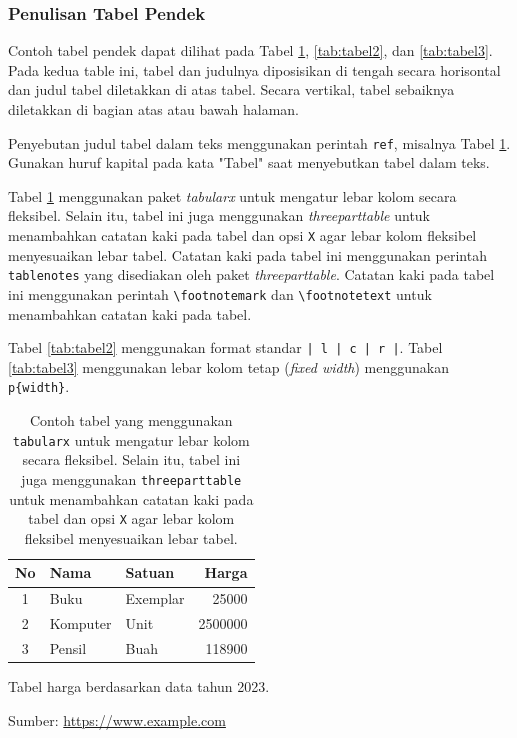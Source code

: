 \subsubsection{Penulisan Tabel Pendek}
Contoh tabel pendek dapat dilihat pada Tabel \ref{tab:tabel1}, \ref{tab:tabel2}, dan \ref{tab:tabel3}.
Pada kedua table ini, tabel dan judulnya diposisikan di tengah secara horisontal dan
judul tabel diletakkan di atas tabel. Secara vertikal, tabel sebaiknya diletakkan di bagian atas atau bawah halaman.

Penyebutan judul tabel dalam teks menggunakan perintah \texttt{ref}, misalnya Tabel \ref{tab:tabel1}.
Gunakan huruf kapital pada kata "Tabel" saat menyebutkan tabel dalam teks.

Tabel \ref{tab:tabel1} menggunakan paket \textit{tabularx} untuk mengatur lebar kolom secara fleksibel.
Selain itu, tabel ini juga menggunakan \textit{threeparttable} untuk menambahkan catatan kaki pada tabel
dan opsi \texttt{X} agar lebar kolom fleksibel menyesuaikan lebar tabel.
Catatan kaki pada tabel ini menggunakan perintah \texttt{tablenotes} yang disediakan oleh paket \textit{threeparttable}.
Catatan kaki pada tabel ini menggunakan perintah \texttt{\textbackslash footnotemark} dan \texttt{\textbackslash footnotetext} untuk menambahkan catatan kaki pada tabel.

Tabel \ref{tab:tabel2} menggunakan format standar \texttt{| l | c | r |}.
Tabel \ref{tab:tabel3} menggunakan lebar kolom tetap (\textit{fixed width}) menggunakan \texttt{p\{width\}}.

\begin{table}
  \centering
    \begin{threeparttable}[t]
    \caption{Contoh tabel yang menggunakan \texttt{tabularx} untuk mengatur lebar kolom secara fleksibel.
    Selain itu, tabel ini juga menggunakan \texttt{threeparttable} untuk menambahkan catatan kaki pada tabel
    dan opsi \texttt{X} agar lebar kolom fleksibel menyesuaikan lebar tabel.}
    \label{tab:tabel1}
    \begin{tabularx}{0.6\textwidth}{| c | X| l | r @{}|}
	    \hline
	    No & Nama 	& Satuan 		& Harga \\
	    \hline
	    1 & Buku 	& Exemplar	& 25000 \\
	    2 & Komputer	& Unit		& 2500000 \\
	    3 & Pensil	& Buah		& 118900 \\
	    \hline
	  \end{tabularx}
    \begin{tablenotes}
      \footnotesize
      \item \footnotemark[1]Tabel harga berdasarkan data tahun 2023.
      \item \footnotemark[2]Sumber: \url{https://www.example.com}
    \end{tablenotes}
  \end{threeparttable}
\end{table}

